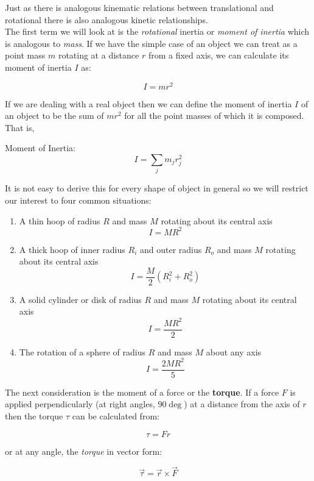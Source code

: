 \documentclass[12pt, letterpaper, twoside]{article}
\begin{document}
\bigskip

Just as there is analogous kinematic relations between translational and rotational there is also analogous kinetic relationships. \\
The first term we will look at is the \emph{rotational} inertia or \emph{moment of inertia} which is analogous to \emph{mass}.  If we have the simple case of an object we can treat as a point mass $m$ rotating at a distance $r$ from a fixed axis, we can calculate its moment of inertia $I$ as:

$$I = mr^2$$

If we are dealing with a real object then we can define the moment of inertia  $I$  of an object to be the sum of  $mr^2$  for all the point masses of which it is composed. That is,



\bigskip


Moment of Inertia:
\begin{equation}
I = \sum_j m_j r_j^2
\end{equation}

\bigskip

It is not easy to derive this for every shape of object in general so we will restrict our interest to four common situations:
\begin{enumerate}
	\item A thin hoop of radius $R$ and mass $M$ rotating about its central axis $$I = MR^2$$
	\item A thick hoop of inner radius $R_i$ and outer radius $R_o$ and mass $M$ rotating about its central axis $$I = \frac{M}{2}(R_i^2 + R_o^2 )$$
	\item A solid cylinder or disk of radius $R$ and mass $M$ rotating about its central axis $$I = \frac{MR^2}{2}$$
	\item The rotation of a sphere of radius $R$ and mass $M$ about any axis $$ I = \frac{2MR^2}{5}$$
\end{enumerate}
	 

\bigskip

The next consideration is the moment of a force or the \textbf{torque}.  If a force $F$ is applied perpendicularly (at right angles, $90\deg$) at a distance from the axis of $r$ then the torque $\tau$ can be calculated from:

$$\tau = Fr$$

or at any angle, the \emph{torque} in vector form:

\begin{equation}
\overrightarrow{\tau} = \overrightarrow{r} \times \overrightarrow{F}
\end{equation}
\end{document}
